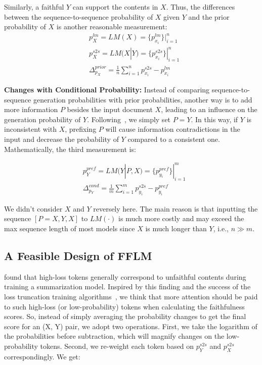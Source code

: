 Similarly, a faithful $Y$ can support the contents in $X$. Thus, the differences between the sequence-to-sequence probability of $X$ given $Y$ and the prior probability of $X$ is another reasonable measurement:
\begin{equation}
	\begin{aligned}
		&p_X^{lm} = LM(X) = \{p_{x_i}^{lm}\}|_{i=1}^n \\
		&p_X^{s2s} = LM(X|Y) = \{p_{x_i}^{s2s}\}|_{i=1}^n\\
		& 	\Delta_{p_X}^{prior} =\frac{1}{n}\sum\nolimits_{i=1}^n  p_{x_i}^{s2s} - p_{x_i}^{lm} 
	\end{aligned}
\end{equation}

\textbf{Changes with Conditional Probability:}
Instead of comparing sequence-to-sequence generation probabilities with prior probabilities, another way is to add more information $P$ besides the input document $X$, leading to an influence on the generation probability of $Y$. Following~\citet{she2022cop}, we simply set $P=Y$. In this way, if $Y$ is inconsistent with $X$, prefixing $P$ will cause information contradictions in the input and decrease the probability of $Y$ compared to a consistent one. Mathematically, the third measurement is:

\begin{equation}
	\begin{aligned}
		&p_Y^{pref} = LM(Y|P, X) = \{p_{y_i}^{pref}\}|_{i=1}^m \\
		& 	\Delta_{p_Y}^{cond} =\frac{1}{m}\sum\nolimits_{i=1}^m  p_{y_i}^{s2s} - p_{y_i}^{pref} 
	\end{aligned}
\end{equation}

We didn't consider $X$ and $Y$ reversely here. The main reason is that inputting the sequence $[P=X, Y, X]$ to $LM(\cdot)$ is much more costly and may exceed the max sequence length of most models since $X$ is much longer than $Y$, i.e., $n\gg m$.


\subsection{A Feasible Design of FFLM}
\label{sec:approach-design}

\citet{goyal2022training} found that high-loss tokens generally correspond 
to unfaithful contents during training a summarization model. 
Inspired by this finding and the success of the loss truncation training 
algorithms~\cite{kang2020improved}, we think that more attention should be 
paid to such high-loss (or low-probability) tokens when calculating 
the faithfulness scores.
So, instead of simply averaging the probability changes to get the final score for an (X, Y) pair, we adopt two operations. First, we take the logarithm of the probabilities before subtraction, which will magnify changes on the low-probability tokens. Second, we re-weight each token based on $p_Y^{s2s}$ and $p_X^{s2s}$ correspondingly. We get:

